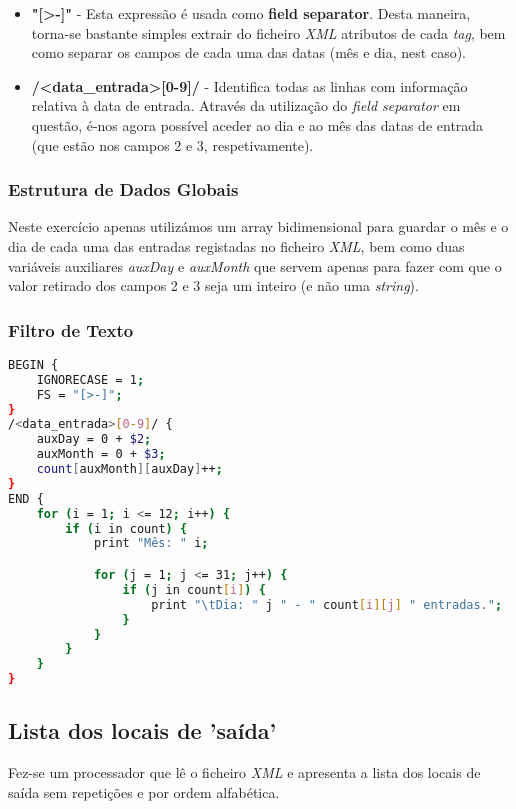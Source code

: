 \documentclass{article}
\begin{document}
\begin{itemize}
    \item \textbf{"[\textgreater-]"} - Esta expressão é usada como \textbf{field separator}. Desta maneira, torna-se bastante simples extrair do ficheiro \emph{XML} atributos de cada \emph{tag}, bem como separar os campos de cada uma das datas (mês e dia, nest caso).
    \item \textbf{/\textless data\_entrada\textgreater[0-9]/} - Identifica todas as linhas com informação relativa à data de entrada. Através da utilização do \emph{field separator} em questão, é-nos agora possível aceder ao dia e ao mês das datas de entrada (que estão nos campos 2 e 3, respetivamente).
\end{itemize}

\subsubsection{Estrutura de Dados Globais}

Neste exercício apenas utilizámos um array bidimensional para guardar o mês e o dia de cada uma das entradas registadas no ficheiro \emph{XML}, bem como duas variáveis auxiliares \emph{auxDay} e \emph{auxMonth} que servem apenas para fazer com que o valor retirado dos campos 2 e 3 seja um inteiro (e não uma \emph{string}).

\subsubsection{Filtro de Texto}

\begin{lstlisting}[language=bash]
BEGIN {
	IGNORECASE = 1;
	FS = "[>-]";
}
/<data_entrada>[0-9]/ {
	auxDay = 0 + $2;
	auxMonth = 0 + $3;
	count[auxMonth][auxDay]++;
}
END {
	for (i = 1; i <= 12; i++) {
		if (i in count) {
			print "Mês: " i;

			for (j = 1; j <= 31; j++) {
				if (j in count[i]) {
					print "\tDia: " j " - " count[i][j] " entradas.";
				}
			} 
		}
	}
}
\end{lstlisting}


\subsection{Lista dos locais de 'saída'}

Fez-se um processador que lê o ficheiro \emph{XML} e apresenta a lista dos locais de saída sem repetições e por ordem alfabética.
\end{document}
